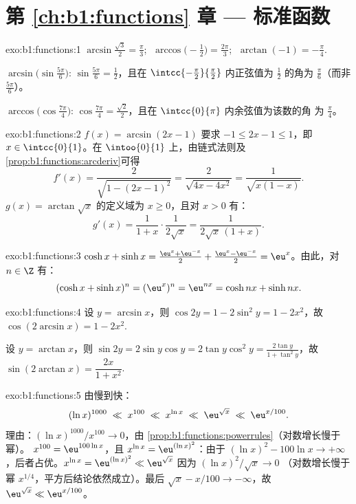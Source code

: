 \section*{第 \ref{ch:b1:functions} 章 --- 标准函数}

\begin{solution}{exo:b1:functions:1}
$\arcsin\frac{\sqrt 3}{2} = \frac\pi3$;
$\;\arccos\bigl(-\frac12\bigr) = \frac{2\pi}{3}$;
$\;\arctan(-1) = -\frac\pi4$.

$\arcsin\bigl(\sin\frac{5\pi}{6}\bigr)$: $\sin\frac{5\pi}{6} =
\frac12$，且在 $\intcc{-\frac\pi2}{\frac\pi2}$ 内正弦值为
$\frac12$ 的角为 $\frac\pi6$（而非 $\frac{5\pi}{6}$）。

$\arccos\bigl(\cos\frac{7\pi}{4}\bigr)$: $\cos\frac{7\pi}{4} =
\frac{\sqrt 2}{2}$，且在 $\intcc{0}{\pi}$ 内余弦值为该数的角
为 $\frac\pi4$。
\end{solution}

\begin{solution}{exo:b1:functions:2}
$f(x) = \arcsin(2x - 1)$ 要求 $-1 \leq 2x - 1 \leq 1$，即 $x
\in \intcc{0}{1}$。在 $\intoo{0}{1}$ 上，由链式法则及
\cref{prop:b1:functions:arcderiv}可得
\[
f'(x) = \frac{2}{\sqrt{1 - (2x-1)^2}} = \frac{2}{\sqrt{4x - 4x^2}}
= \frac{1}{\sqrt{x(1 - x)}} .
\]
$g(x) = \arctan\sqrt x$ 的定义域为 $x \geq 0$，且对 $x > 0$ 有：
\[
g'(x) = \frac{1}{1 + x} \cdot \frac{1}{2\sqrt x}
= \frac{1}{2\sqrt x\,(1 + x)} .
\]
\end{solution}

\begin{solution}{exo:b1:functions:3}
$\cosh x + \sinh x = \frac{\eu^x + \eu^{-x}}{2} + \frac{\eu^x -
\eu^{-x}}{2} = \eu^x$。由此，对 $n \in \Z$ 有：
\[
(\cosh x + \sinh x)^n = (\eu^x)^n = \eu^{nx}
= \cosh nx + \sinh nx .
\]
\end{solution}

\begin{solution}{exo:b1:functions:4}
设 $y = \arcsin x$，则 $\cos 2y = 1 - 2\sin^2 y = 1 - 2x^2$，故
$\cos(2\arcsin x) = 1 - 2x^2$.

设 $y = \arctan x$，则 $\sin 2y = 2 \sin y \cos y = 2 \tan y \cos^2 y =
\frac{2\tan y}{1 + \tan^2 y}$，故 $\sin(2\arctan x) =
\dfrac{2x}{1 + x^2}$.
\end{solution}

\begin{solution}{exo:b1:functions:5}
由慢到快：
\[
(\ln x)^{1000} \;\ll\; x^{100} \;\ll\; x^{\ln x} \;\ll\;
\eu^{\sqrt x} \;\ll\; \eu^{x/100} .
\]
理由：$(\ln x)^{1000}/x^{100} \to 0$，由
\cref{prop:b1:functions:powerrules}（对数增长慢于幂）。
$x^{100} = \eu^{100\ln x}$，且 $x^{\ln x} = \eu^{(\ln x)^2}$：由于
$(\ln x)^2 - 100\ln x \to +\infty$，后者占优。$x^{\ln x} =
\eu^{(\ln x)^2} \ll \eu^{\sqrt x}$ 因为 $(\ln x)^2/\sqrt x \to 0$
（对数增长慢于幂 $x^{1/4}$，平方后结论依然成立）。最后 $\sqrt x - x/100
\to -\infty$，故 $\eu^{\sqrt x} \ll \eu^{x/100}$。
\end{solution}

